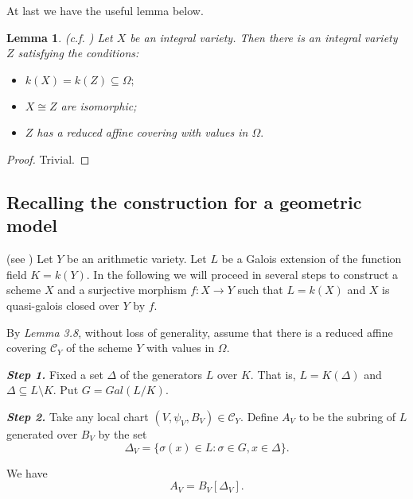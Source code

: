 \documentclass[12pt,twoside,reqno]{amsart}
\newtheorem{lemma}[theorem]{Lemma}
\theoremstyle{definition}
\numberwithin{equation}{section}
\begin{document}
At last we have the useful lemma below.

\begin{lemma}
\emph{(c.f. \cite{An4})} Let $X$ be an integral variety. Then there is an
integral variety $Z$ satisfying the conditions:

\begin{itemize}
\item $k\left( X\right) =k\left( Z\right) \subseteq \Omega ;$

\item $X\cong Z$ are isomorphic;

\item $Z$ has a reduced affine covering with values in $\Omega .$
\end{itemize}
\end{lemma}

\begin{proof}
Trivial.
\end{proof}

\subsection{Recalling the construction for a geometric model}

(see \cite{An3,An4}) Let $Y$ be an arithmetic variety. Let $L$ be a Galois
extension of the function field $K=k\left( Y\right) .$ In the following we
will proceed in several steps to construct a scheme $X$ and a surjective
morphism $f:X\rightarrow Y$ such that $L=k\left( X\right) $ and $X$ is
quasi-galois closed over $Y$ by $f$.

By \emph{Lemma 3.8}, without loss of generality, assume that there is a
reduced affine covering $\mathcal{C}_{Y}$ of the scheme $Y$ with values in $\Omega .$

\emph{\textbf{Step 1.}} Fixed a set $\Delta $ of the generators $L$ over $K.$
That is, $L=K\left( \Delta \right) $ and $\Delta \subseteq L\setminus K.$
Put $G=Gal\left( L/K\right) .$

\emph{\textbf{Step 2.}} Take any local chart $\left( V,\psi
_{V},B_{V}\right) \in \mathcal{C}_{Y}.$ Define $A_{V}$ to be the subring of $L$ generated over $B_{V}$ by the set
\begin{equation*}
\Delta _{V}=\{\sigma \left( x\right) \in L:\sigma \in G,x\in \Delta \}.
\end{equation*}

We have
\begin{equation*}
A_{V}=B_{V}\left[ \Delta _{V}\right] .
\end{equation*}
\end{document}
